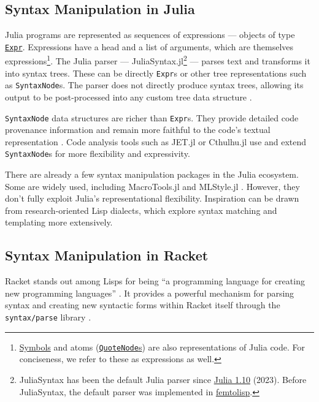 \documentclass{juliacon}
\begin{document}
\subsection{Syntax Manipulation in Julia}
\label{sec:org581a919}

Julia programs are represented as sequences of expressions — objects
of type \href{https://docs.julialang.org/en/v1/base/base/\#Core.Expr}{\texttt{Expr}}. Expressions have a head and a list of arguments, which
are themselves expressions\footnote{\href{https://docs.julialang.org/en/v1/manual/metaprogramming/\#Symbols}{Symbols} and atoms (\href{https://docs.julialang.org/en/v1/manual/metaprogramming/\#man-quote-node}{\texttt{QuoteNode}s}) are also representations of
Julia code. For conciseness, we refer to these as expressions as well.}. The Julia parser —
JuliaSyntax.jl\footnote{JuliaSyntax has been the default Julia parser since \href{https://github.com/JuliaLang/julia/releases/tag/v1.10.0}{Julia 1.10}
(2023). Before JuliaSyntax, the default parser was implemented in
\href{https://github.com/JuliaLang/julia/blob/master/src/julia-parser.scm}{femtolisp}.} — parses text and transforms it into syntax
trees. These can be directly \texttt{Expr}s or other tree representations
such as \texttt{SyntaxNode}s. The parser does not directly produce syntax
trees, allowing its output to be post-processed into any custom tree
data structure \cite{parse_stream}.

\texttt{SyntaxNode} data structures are richer than \texttt{Expr}s. They provide
detailed code provenance information and remain more faithful to the
code's textual representation \cite{syntax_nodes}. Code analysis
tools such as JET.jl \cite{jet} or Cthulhu.jl \cite{cthulhu} use and
extend \texttt{SyntaxNode}s for more flexibility and expressivity.

There are already a few syntax manipulation packages in the Julia
ecosystem. Some are widely used, including MacroTools.jl
\cite{macro_tools} and MLStyle.jl \cite{mlstyle}. However, they
don't fully exploit Julia's representational flexibility. Inspiration
can be drawn from research-oriented Lisp dialects, which explore
syntax matching and templating more extensively.

\subsection{Syntax Manipulation in Racket}
\label{sec:orgc44ac28}

Racket stands out among Lisps for being ``a programming language for
creating new programming languages'' \cite{racket_manifesto}. It
provides a powerful mechanism for parsing syntax and creating new
syntactic forms within Racket itself through the \texttt{syntax/parse}
library \cite{syntax_parse}.
\end{document}
